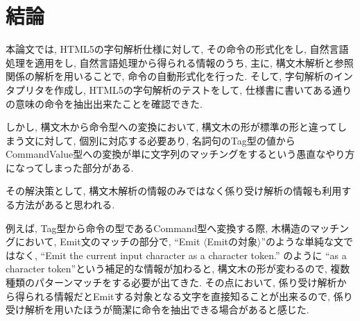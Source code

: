 \documentclass[uplatex,a4j]{jsreport}
\begin{document}
\chapter{結論}
本論文では, HTML5の字句解析仕様に対して, その命令の形式化をし, 自然言語処理を適用をし, 
自然言語処理から得られる情報のうち, 主に, 構文木解析と参照関係の解析を用いることで, 命令の自動形式化を行った. 
そして, 字句解析のインタプリタを作成し, HTML5の字句解析のテストをして, 仕様書に書いてある通りの意味の命令を抽出出来たことを確認できた. 

しかし, 
構文木から命令型への変換において, 構文木の形が標準の形と違ってしまう文に対して, 個別に対応する必要あり, 
名詞句のTag型の値からCommandValue型への変換が単に文字列のマッチングをするという愚直なやり方になってしまった部分がある. 

その解決策として, 構文木解析の情報のみではなく係り受け解析の情報も利用する方法があると思われる. 

例えば, Tag型から命令の型であるCommand型へ変換する際, 
木構造のマッチングにおいて, 
Emit文のマッチの部分で, 
``Emit $\langle$Emitの対象$\rangle$''のような単純な文ではなく, ``Emit the current input character as a character token.'' のように ``as a character token''という補足的な情報が加わると, 構文木の形が変わるので, 複数種類のパターンマッチをする必要が出てきた. 
その点において, 
係り受け解析から得られる情報だとEmitする対象となる文字を直接知ることが出来るので, 係り受け解析を用いたほうが簡潔に命令を抽出できる場合があると感じた. 
\end{document}
